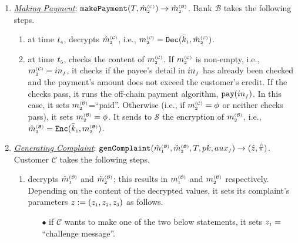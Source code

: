 \begin{enumerate}[leftmargin=.46cm]
\item\label{Making-Payment} \underline{\textit{Making Payment}}: $\mathtt{makePayment}(T, \hat m^{\scriptscriptstyle\mathcal{(C)}}_{\scriptscriptstyle2})\rightarrow \hat m^{\scriptscriptstyle\mathcal{(B)}}_{\scriptscriptstyle2}$.
%
Bank $\mathcal{B}$ takes the following steps. 
\begin{enumerate}
%
 \item at time $t_{\scriptscriptstyle 4}$, decrypts   $\hat m_{\scriptscriptstyle 2}^{\scriptscriptstyle(\mathcal C)}$, i.e.,  $ m_{\scriptscriptstyle 2}^{\scriptscriptstyle(\mathcal{C})}= \mathtt{Dec}(\bar k_{\scriptscriptstyle 1}, \hat m_{\scriptscriptstyle 2}^{\scriptscriptstyle(\mathcal C)})$.
 \item at time $t_{\scriptscriptstyle 5}$, checks the content of $m_{\scriptscriptstyle 2}^{\scriptscriptstyle(\mathcal C)}$. If $m_{\scriptscriptstyle 2}^{\scriptscriptstyle(\mathcal C)}$ is non-empty, i.e., $m_{\scriptscriptstyle 2}^{\scriptscriptstyle(\mathcal C)}=in_{\scriptscriptstyle f}$, it checks if the payee's detail in $in_{\scriptscriptstyle f}$ has already been checked and the payment's amount does not exceed the customer's credit. If the checks pass, it  runs the off-chain payment algorithm, $\mathtt{pay}(in_{\scriptscriptstyle f})$.  In this case, it sets $m_{\scriptscriptstyle 2}^{\scriptscriptstyle(\mathcal B)}$=``paid''. Otherwise (i.e., if $m_{\scriptscriptstyle 2}^{\scriptscriptstyle(\mathcal C)}=\phi$ or neither checks pass), it sets $m_{\scriptscriptstyle 2}^{\scriptscriptstyle(\mathcal B)}=\phi$. It sends  to $\mathcal{S}$ the encryption of  $m_{\scriptscriptstyle 2}^{\scriptscriptstyle(\mathcal B)}$, i.e., $\hat m_{\scriptscriptstyle 2}^{\scriptscriptstyle(\mathcal{B})}= \mathtt{Enc}(\bar k_{\scriptscriptstyle 1}, m_{\scriptscriptstyle 2}^{\scriptscriptstyle(\mathcal B)})$.  %
\end{enumerate}
%

\item\label{Generating-Complaint}  \underline{\textit{Generating Complaint}}: $\mathtt{genComplaint}(\hat m^{\scriptscriptstyle\mathcal{(B)}}_{\scriptscriptstyle 1}, \hat m^{\scriptscriptstyle\mathcal{(B)}}_{\scriptscriptstyle2}, T, pk, {aux}_{\scriptscriptstyle f})\rightarrow  (\hat z, \hat{\ddot \pi})$. 
%
Customer $\mathcal{C}$ takes the following steps. 
\begin{enumerate}
%
\item\label{DR::C-sends-complaint} decrypts $ \hat m^{\scriptscriptstyle\mathcal{(B)}}_{\scriptscriptstyle 1}$ and $\hat m^{\scriptscriptstyle\mathcal{(B)}}_{\scriptscriptstyle2}$; this results in $  m^{\scriptscriptstyle\mathcal{(B)}}_{\scriptscriptstyle 1}$ and $ m^{\scriptscriptstyle\mathcal{(B)}}_{\scriptscriptstyle2}$ respectively. Depending on the content of  the decrypted values, it sets its complaint's parameters $z:=(z_{\scriptscriptstyle 1}, z_{\scriptscriptstyle 2}, z_{\scriptscriptstyle 3})$ as follows.  %

\begin{itemize}
%
%
 \item  [$\bullet$] if $\mathcal{C}$ wants to make one of the two below statements, it sets  $z_{\scriptscriptstyle 1}=$``challenge message''.
 

\end{itemize}
\end{enumerate}
\end{enumerate}
